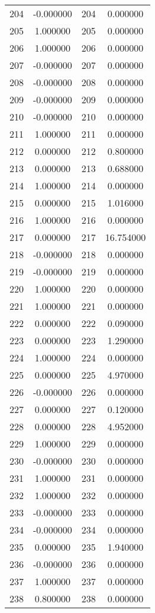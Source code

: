 \documentclass[12pt]{article}
\begin{document}
\begin{longtable}{@{}cccc@{}}
204 & -0.000000 & 204 & 0.000000 \\
205 & 1.000000 & 205 & 0.000000 \\
206 & 1.000000 & 206 & 0.000000 \\
207 & -0.000000 & 207 & 0.000000 \\
208 & -0.000000 & 208 & 0.000000 \\
209 & -0.000000 & 209 & 0.000000 \\
210 & -0.000000 & 210 & 0.000000 \\
211 & 1.000000 & 211 & 0.000000 \\
212 & 0.000000 & 212 & 0.800000 \\
213 & 0.000000 & 213 & 0.688000 \\
214 & 1.000000 & 214 & 0.000000 \\
215 & 0.000000 & 215 & 1.016000 \\
216 & 1.000000 & 216 & 0.000000 \\
217 & 0.000000 & 217 & 16.754000 \\
218 & -0.000000 & 218 & 0.000000 \\
219 & -0.000000 & 219 & 0.000000 \\
220 & 1.000000 & 220 & 0.000000 \\
221 & 1.000000 & 221 & 0.000000 \\
222 & 0.000000 & 222 & 0.090000 \\
223 & 0.000000 & 223 & 1.290000 \\
224 & 1.000000 & 224 & 0.000000 \\
225 & 0.000000 & 225 & 4.970000 \\
226 & -0.000000 & 226 & 0.000000 \\
227 & 0.000000 & 227 & 0.120000 \\
228 & 0.000000 & 228 & 4.952000 \\
229 & 1.000000 & 229 & 0.000000 \\
230 & -0.000000 & 230 & 0.000000 \\
231 & 1.000000 & 231 & 0.000000 \\
232 & 1.000000 & 232 & 0.000000 \\
233 & -0.000000 & 233 & 0.000000 \\
234 & -0.000000 & 234 & 0.000000 \\
235 & 0.000000 & 235 & 1.940000 \\
236 & -0.000000 & 236 & 0.000000 \\
237 & 1.000000 & 237 & 0.000000 \\
238 & 0.800000 & 238 & 0.000000 \\

\end{longtable}
\end{document}
